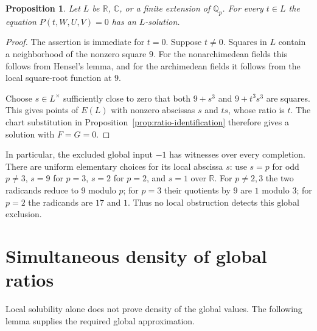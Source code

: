 \documentclass[11pt,a4paper]{article}
\newtheorem{proposition}[theorem]{Proposition}
\theoremstyle{definition}
\newcommand{\Q}{\mathbb Q}\newcommand{\Z}{\mathbb Z}
\begin{document}
\begin{proposition}\label{prop:all-local}
Let $L$ be $\mathbb R$, $\mathbb C$, or a finite extension of
$\Q_p$. For every $t\in L$ the equation $P(t,W,U,V)=0$ has an
$L$-solution.
\end{proposition}
\begin{proof}
The assertion is immediate for $t=0$. Suppose $t\ne0$.
Squares in $L$ contain a neighborhood of the nonzero square $9$.
For the nonarchimedean fields this follows from Hensel's lemma,
and for the archimedean fields it follows from the local square-root
function at $9$.

Choose $s\in L^\times$ sufficiently close to zero that both
$9+s^3$ and $9+t^3s^3$ are squares. This gives points of $E(L)$
with nonzero abscissas $s$ and $ts$, whose ratio is $t$.
The chart substitution in Proposition~\ref{prop:ratio-identification}
therefore gives a solution with $F=G=0$.
\end{proof}

In particular, the excluded global input $-1$ has witnesses over
every completion. There are uniform elementary choices for its
local abscissa $s$: use $s=p$ for odd $p\ne3$, $s=9$ for $p=3$,
$s=2$ for $p=2$, and $s=1$ over $\mathbb R$.
For $p\ne2,3$ the two radicands reduce to $9$ modulo $p$;
for $p=3$ their quotients by $9$ are $1$ modulo $3$;
for $p=2$ the radicands are $17$ and $1$.
Thus no local obstruction detects this global exclusion.

\section{Simultaneous density of global ratios}\label{sec:density}

Local solubility alone does not prove density of the global values.
The following lemma supplies the required global approximation.
\end{document}
